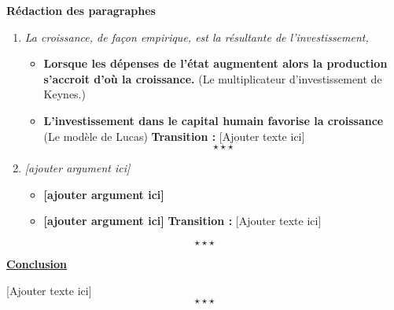 \begin{center}
	{\bfseries Rédaction des paragraphes}	
\end{center}
\begin{enumerate}[label*=$\longrightarrow$]
	\item \textit{La croissance, de façon empirique, est la résultante de l'investissement,}
	\begin{itemize}
		\item \textbf{Lorsque les dépenses de l'état augmentent alors la production s'accroit d'où la croissance.} (Le multiplicateur d'investissement de Keynes.)
		\item \textbf{L'investissement dans le capital humain favorise la croissance} (Le modèle de Lucas) \newline 
		\textbf{Transition :} [Ajouter texte ici] $$\star \star \star$$
	\end{itemize}
	\item \textit{[ajouter argument ici]}
	\begin{itemize}
		\item \textbf{[ajouter argument ici]}
		\item \textbf{[ajouter argument ici]} \newline 
		\textbf{Transition :} [Ajouter texte ici]
	\end{itemize}
\end{enumerate}
$$\star \star \star$$
\begin{center}
	\textbf{\underline{Conclusion}} 
\end{center} 

[Ajouter texte ici] $$\star \star \star$$